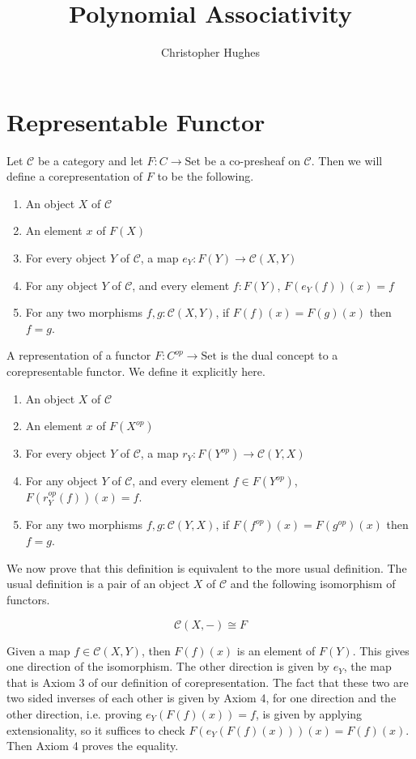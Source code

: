 \documentclass[12pt]{article} %
\title{Polynomial Associativity}
\author{Christopher Hughes}
\theoremstyle{definition}
\theoremstyle{definition}
\theoremstyle{definition}
\theoremstyle{definition}
\begin{document}
\section{Representable Functor}

Let $\mathcal{C}$ be a category and let $F : C \to \text{Set}$
be a co-presheaf on $\mathcal{C}$. Then we will define a corepresentation of
$F$ to be the following.

\begin{enumerate}
  \item An object $X$ of $\mathcal{C}$
  \item An element $x$ of $F(X)$
  \item For every object $Y$ of $\mathcal{C}$, a map $e_Y : F(Y) \to \mathcal{C}(X, Y)$
  \item For any object $Y$ of $\mathcal{C}$, and every element $f : F(Y)$, $F(e_Y(f))(x) = f$
  \item For any two morphisms $f, g : \mathcal{C}(X, Y)$, if $F(f)(x) = F(g)(x)$ then $f = g$.
\end{enumerate}

A representation of a functor $F : C^{op} \to \text{Set}$ is the dual concept to a corepresentable
functor. We define it explicitly here.

\begin{enumerate}
  \item An object $X$ of $\mathcal{C}$
  \item An element $x$ of $F(X^{op})$
  \item For every object $Y$ of $\mathcal{C}$, a map $r_Y : F(Y^{op}) \to \mathcal{C}(Y, X)$
  \item For any object $Y$ of $\mathcal{C}$, and every element $f \in F(Y^{op})$, $F(r_Y^{op}(f))(x) = f$.
  \item For any two morphisms $f, g : \mathcal{C}(Y, X)$, if $F(f^{op})(x) = F(g^{op})(x)$ then $f = g$.
\end{enumerate}

We now prove that this definition is equivalent to the more usual definition.
The usual definition is a pair of an object $X$ of $\mathcal{C}$ and 
the following isomorphism of functors.

\begin{equation}
\mathcal{C}(X, -) \cong F
\end{equation}

Given a map $f \in \mathcal{C}(X, Y)$, then $F(f)(x)$ is an element of $F(Y)$. This gives one 
direction of the isomorphism. The other direction is given by $e_Y$, the map that is
Axiom 3 of our definition of corepresentation. The fact that these two are two sided inverses
of each other is given by Axiom 4, for one direction and the other direction, i.e.
proving $e_Y(F(f)(x)) = f$, is given by applying extensionality,
so it suffices to check $F(e_Y(F(f)(x)))(x) = F(f)(x)$. Then Axiom 4 proves the equality.
\end{document}
